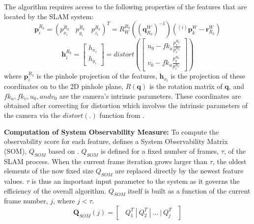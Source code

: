 \documentclass[10pt,twocolumn,letterpaper]{article}
\begin{document}
The algorithm requires access to the following properties of the features that are located by the SLAM system: 
\begin{equation} \label{eq:featureProjection}
\boldsymbol{p}_{i}^{R_k} = ({p}_{x_i}^{R_k} \ \ \ \  {p}_{y_i}^{R_k}  \ \ \ \  {p}_{z_i}^{R_k})^T = R^{R_k}_{W}((\boldsymbol{q}^{W}_{R_k})^{-1})(^{(i)}\boldsymbol{p}^{W}_{k} - \boldsymbol{r}^{W}_{R_k})
\end{equation}
\begin{equation} \label{eq:featureProjection2}
\boldsymbol{h}_{i}^{R_k} = \begin{bmatrix} {h}_{x_i} \\ {h}_{y_i} \end{bmatrix} = distort(\begin{bmatrix}
u_0 - fk_u\frac{p_x^{R_k}}{p_z^{R_k}}\\
v_0 - fk_u\frac{p_y^{R_k}}{p_z^{R_k}}
\end{bmatrix})
\end{equation}
where $\boldsymbol{p}_{i}^{R_k}$ is the pinhole projection of the features,  
$\boldsymbol{h}_{x_i}$ is the projection of these coordinates on to the 2D pinhole plane, $R(\boldsymbol{q})$ is the rotation matrix of $\boldsymbol{q}$, and $fk_u, fk_v, u_0, and v_0$ are the camera's intrinsic parameters.
These coordinates are obtained after correcting for distortion which involves the intrinsic parameters of the camera via the $distort(.)$ function from \cite{distort}.

\textbf{Computation of System Observability Measure:} To compute the observability score for each feature,
\cite{Zhang_2015_CVPR} defines a System Observability Matrix (SOM), ${Q}_{SOM}$ based on \cite{gf15}. ${Q}_{SOM}$ is defined for a fixed number 
of frames, $\tau$, of the SLAM process. When the current frame iteration grows larger than $\tau$, the oldest
 elements of the now fixed size ${Q}_{SOM}$ are replaced directly by the newest feature values. $\tau$ is 
 thus an important input parameter to the system as it governs the efficiency of the overall algorithm. 
 ${Q}_{SOM}$ itself is built as a function of the current frame number, $j$, where 
 $j<\tau$. 
\begin{equation} \label{eq:qsom}
\boldsymbol{Q}_{SOM}(j) = \begin{bmatrix} \ \ Q_1^T \ | \ Q_2^T \ | \ ... \ | \ Q_j^T  \ \ \end{bmatrix}
\end{equation}
\end{document}
